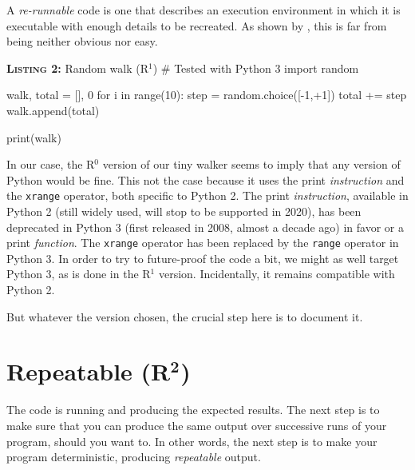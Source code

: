 \documentclass[a4paper,11pt]{article}
\begin{document}
A \emph{re-runnable} code is one that describes an execution environment in which it is executable with enough details to be recreated.
As shown by \citep{Collberg:2016}, this is far from being neither obvious nor easy.

% 
% 
%
\begin{code}{\textbf{\textsc{Listing 2:}} Random walk (R$^1$)}
# Tested with Python 3
import random

walk, total = [], 0
for i in range(10):
    step = random.choice([-1,+1])     
    total += step
    walk.append(total)
    
print(walk)
\end{code}

In our case, the R$^0$ version of our tiny walker seems to imply
that any version of Python would be fine.
This not the case because it uses the print {\em instruction} and the {\tt xrange} operator, both specific to Python 2.
The print {\em instruction}, available in Python 2 (still widely used, will stop to be supported in 2020), 
has been deprecated in Python 3 (first released in 2008, almost a decade ago)
in favor or a  print {\em function}.
The {\tt xrange} operator has been replaced by the {\tt range} operator in Python 3.
In order to try to future-proof the code a bit, we might as well target Python 3, as is done in the R$^1$ version.
Incidentally, it remains compatible with Python 2.

But whatever the version chosen,
the crucial step here is to document it.


\clearpage
\section*{Repeatable (R$^{\mathbf 2}$)}

% 
% 
% 

The code is running and producing the expected results. 
The next step is to make sure that you can produce the same output over successive runs of your program, 
should you want to. 
In other words, the next step is to make your program deterministic, 
producing {\em repeatable} output. 
\end{document}
